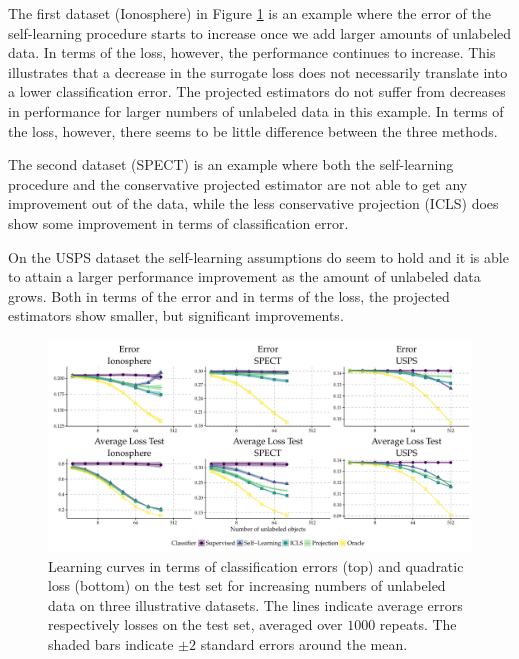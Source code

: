 \documentclass[smallcondensed]{svjour3}\usepackage[]{graphicx}\usepackage[]{color}
\makeatletter
\def\maxwidth{ %
  \ifdim\Gin@nat@width>\linewidth
    \linewidth
  \else
    \Gin@nat@width
  \fi
}
\newenvironment{knitrout}{}{} %
\makeatother
\begin{document}
The first dataset (Ionosphere) in Figure \ref{fig:learningcurves-projection} is an example where the error of the self-learning procedure starts to increase once we add larger amounts of unlabeled data. In terms of the loss, however, the performance continues to increase. This illustrates that a decrease in the surrogate loss does not necessarily translate into a lower classification error. The projected estimators do not suffer from decreases in performance for larger numbers of unlabeled data in this example. In terms of the loss, however, there seems to be little difference between the three methods.

The second dataset (SPECT) is an example where both the self-learning procedure and the conservative projected estimator are not able to get any improvement out of the data, while the less conservative projection (ICLS) does show some improvement in terms of classification error.

On the USPS dataset the self-learning assumptions do seem to hold and it is able to attain a larger performance improvement as the amount of unlabeled data grows. Both in terms of the error and in terms of the loss, the projected estimators show smaller, but significant improvements.


\begin{knitrout}
\color{fgcolor}\begin{figure}
\includegraphics[width=\maxwidth]{learningcurves-projection-1} \caption[Learning curves in terms of classification errors (top) and quadratic loss (bottom) on the test set for increasing numbers of unlabeled data on three illustrative datasets]{Learning curves in terms of classification errors (top) and quadratic loss (bottom) on the test set for increasing numbers of unlabeled data on three illustrative datasets. The lines indicate average errors respectively losses on the test set, averaged over $1000$ repeats. The shaded bars indicate $\pm 2$ standard errors around the mean.}\label{fig:learningcurves-projection}
\end{figure}


\end{knitrout}
\end{document}
